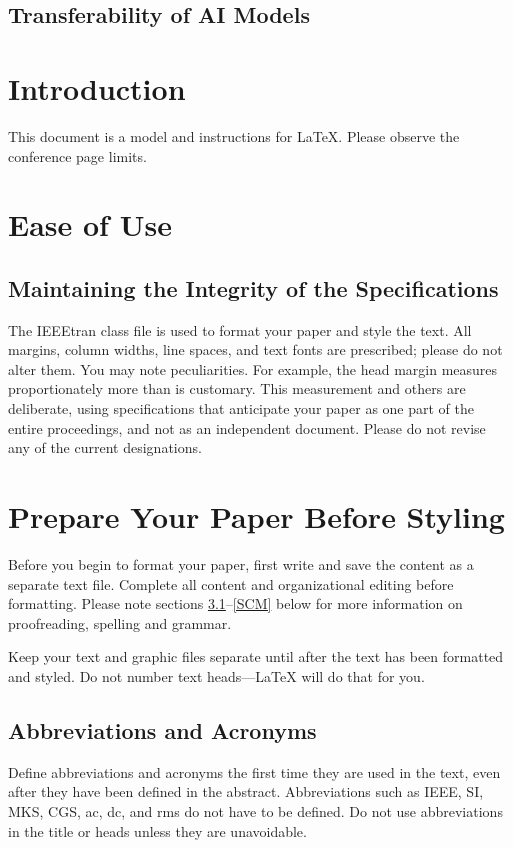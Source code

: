 \documentclass[conference]{IEEEtran}
\begin{document}
\subsection{Transferability of AI Models}
 


\clearpage

\section{Introduction}
This document is a model and instructions for \LaTeX.
Please observe the conference page limits. 

\section{Ease of Use}

\subsection{Maintaining the Integrity of the Specifications}

The IEEEtran class file is used to format your paper and style the text. All margins, 
column widths, line spaces, and text fonts are prescribed; please do not 
alter them. You may note peculiarities. For example, the head margin
measures proportionately more than is customary. This measurement 
and others are deliberate, using specifications that anticipate your paper 
as one part of the entire proceedings, and not as an independent document. 
Please do not revise any of the current designations.

\section{Prepare Your Paper Before Styling}
Before you begin to format your paper, first write and save the content as a 
separate text file. Complete all content and organizational editing before 
formatting. Please note sections \ref{AA}--\ref{SCM} below for more information on 
proofreading, spelling and grammar.

Keep your text and graphic files separate until after the text has been 
formatted and styled. Do not number text heads---{\LaTeX} will do that 
for you.

\subsection{Abbreviations and Acronyms}\label{AA}
Define abbreviations and acronyms the first time they are used in the text, 
even after they have been defined in the abstract. Abbreviations such as 
IEEE, SI, MKS, CGS, ac, dc, and rms do not have to be defined. Do not use 
abbreviations in the title or heads unless they are unavoidable.
\end{document}
